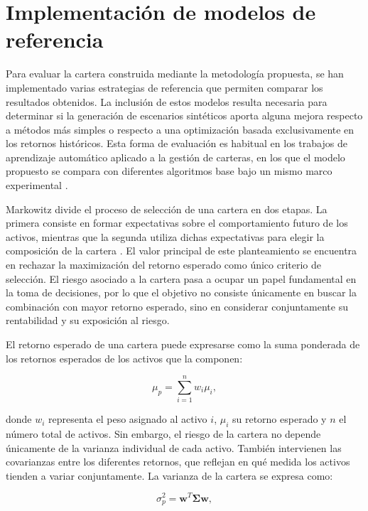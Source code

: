 \section{Implementación de modelos de referencia}

Para evaluar la cartera construida mediante la metodología propuesta, se han implementado varias estrategias de referencia que permiten comparar los resultados obtenidos. La inclusión de estos modelos resulta necesaria para determinar si la generación de escenarios sintéticos aporta alguna mejora respecto a métodos más simples o respecto a una optimización basada exclusivamente en los retornos históricos. Esta forma de evaluación es habitual en los trabajos de aprendizaje automático aplicado a la gestión de carteras, en los que el modelo propuesto se compara con diferentes algoritmos base bajo un mismo marco experimental \cite{zhang2020deep}.

Markowitz divide el proceso de selección de una cartera en dos etapas. La primera consiste en formar expectativas sobre el comportamiento futuro de los activos, mientras que la segunda utiliza dichas expectativas para elegir la composición de la cartera \cite{markowitz1952}. El valor principal de este planteamiento se encuentra en rechazar la maximización del retorno esperado como único criterio de selección. El riesgo asociado a la cartera pasa a ocupar un papel fundamental en la toma de decisiones, por lo que el objetivo no consiste únicamente en buscar la combinación con mayor retorno esperado, sino en considerar conjuntamente su rentabilidad y su exposición al riesgo.

El retorno esperado de una cartera puede expresarse como la suma ponderada de los retornos esperados de los activos que la componen:

\begin{equation}
\mu_p = \sum_{i=1}^{n} w_i \mu_i,
\end{equation}

donde \(w_i\) representa el peso asignado al activo \(i\), \(\mu_i\) su retorno esperado y \(n\) el número total de activos. Sin embargo, el riesgo de la cartera no depende únicamente de la varianza individual de cada activo. También intervienen las covarianzas entre los diferentes retornos, que reflejan en qué medida los activos tienden a variar conjuntamente. La varianza de la cartera se expresa como:

\begin{equation}
\sigma_p^2 = \mathbf{w}^{T}\boldsymbol{\Sigma}\mathbf{w},
\end{equation}

